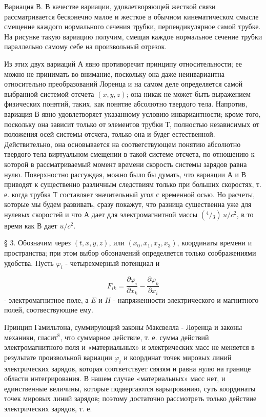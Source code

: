 \documentclass[11pt]{article}
\begin{document}
    Вариация В. В качестве вариации, удовлетворяющей жесткой связи
рассматривается бесконечно малое и жесткое в обычном кинематическом
смысле смещение каждого нормального сечения трубки, перпендикулярное
самой трубке. На рисунке такую вариацию получим, смещая каждое
нормальное сечение трубки параллельно самому себе на произвольный
отрезок.

    Из этих двух вариаций А явно противоречит принципу относительности; ее
можно не принимать во внимание, поскольку она даже неинвариантна
относительно преобразований Лоренца и на самом деле определяется самой
выбранной системой отсчета \((x, y, z)\); она никак не может быть
выражением физических понятий, таких, как понятие абсолютно твердого
тела. Напротив, вариация В явно удовлетворяет указанному условию
инвариантности; кроме того, поскольку она зависит только от элементов
трубки Т, полностью независимых от положения осей системы отсчега,
только она и будег естественной. Действительно, она основывается на
соотвегствующем понятию абсолютно твердого тела виртуальном смещении в
такой системе отсчета, по отношению к которой в рассматриваемый момент
времени скорость системы зарядов равна нулю. Поверхностно рассуждая,
можно было бы думать, что вариации А и В приводят к существенно
различным следствиям только при больших скоростях, т. е. когда трубка Т
составляет значительный угол с временной осью. Но расчеты, которые мы
будем развивать, сразу покажут, что разница существенна уже для нулевых
скоростей и что А дает для электромагнитной массы
\(\left({}^{4} \big /{}_{3}\right) \, u/c^2\), в то время как В дает
\(u/c^2\).

    § 3. Обозначим через \((t, x, y, z)\), или \((x_0, x_1, x_2, x_3)\),
координаты времени и пространства; при этом выбор обозначений
определяется только соображениями удобства. Пусть \(\varphi_i\) -
четырехмерный потенциал и

\[F_{ik}=\frac{\partial \varphi_i}{\partial x_k} - \frac{\partial \varphi_k}{\partial x_i}\]
- электромагнитное поле, а \(E\) и \(H\) - напряженности электрического
и магнитного полей, соотвествующие ему.

    Принцип Гамильтона, суммирующий законы Максвелла - Лоренца и законы
механики, гласит\(^8\), что суммарное действие, т. е. сумма действий
электромагнитного поля и «материальных» и электрических масс не меняется
в результате произвольной вариации \(\varphi_i\) и координат точек
мировых линий электрических зарядов, которая соответствует связям и
равна нулю на границе области интегрирования. В нашем случае
«материальных» масс нет, и единственные величины, которые подвергаются
варьированию, суть координаты точек мировых линий зарядов; поэтому
достаточно рассмотреть только действие электрических зарядов, т. е.
\end{document}
